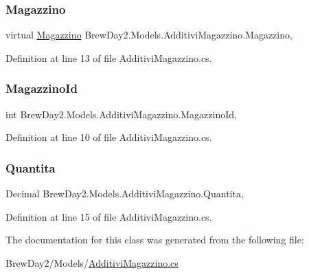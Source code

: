 \subsubsection{\texorpdfstring{Magazzino}{Magazzino}}
{\footnotesize\ttfamily virtual \mbox{\hyperlink{class_brew_day2_1_1_models_1_1_magazzino}{Magazzino}} Brew\+Day2.\+Models.\+Additivi\+Magazzino.\+Magazzino\hspace{0.3cm}{\ttfamily [get]}, {\ttfamily [set]}}



Definition at line 13 of file Additivi\+Magazzino.\+cs.

\mbox{\label{class_brew_day2_1_1_models_1_1_additivi_magazzino_ab2f88243c42c08091ab0cb76b5a45ea9}} 
\subsubsection{\texorpdfstring{Magazzino\+Id}{MagazzinoId}}
{\footnotesize\ttfamily int Brew\+Day2.\+Models.\+Additivi\+Magazzino.\+Magazzino\+Id\hspace{0.3cm}{\ttfamily [get]}, {\ttfamily [set]}}



Definition at line 10 of file Additivi\+Magazzino.\+cs.

\mbox{\label{class_brew_day2_1_1_models_1_1_additivi_magazzino_a481acc906575d81e68a65412635cfa5c}} 
\subsubsection{\texorpdfstring{Quantita}{Quantita}}
{\footnotesize\ttfamily Decimal Brew\+Day2.\+Models.\+Additivi\+Magazzino.\+Quantita\hspace{0.3cm}{\ttfamily [get]}, {\ttfamily [set]}}



Definition at line 15 of file Additivi\+Magazzino.\+cs.



The documentation for this class was generated from the following file\+:\begin{DoxyCompactItemize}
\item 
Brew\+Day2/\+Models/\mbox{\hyperlink{_additivi_magazzino_8cs}{Additivi\+Magazzino.\+cs}}\end{DoxyCompactItemize}
